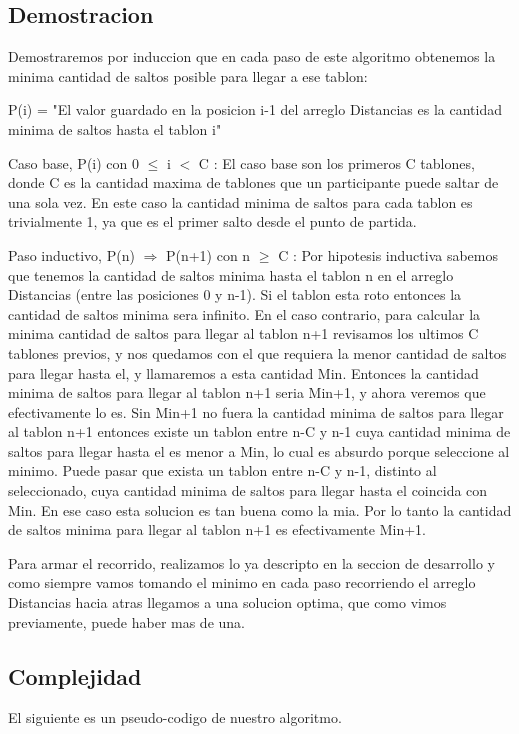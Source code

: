 \subsection{Demostracion}

Demostraremos por induccion que en cada paso de este algoritmo obtenemos la minima cantidad de saltos posible para llegar a ese tablon:

P(i) = "El valor guardado en la posicion i-1 del arreglo Distancias es la cantidad minima de saltos hasta el tablon i"

Caso base, P(i) con 0 $\leq$ i $<$ C :
El caso base son los primeros C tablones, donde C es la cantidad maxima de tablones que un participante puede saltar de una sola vez. En este caso la cantidad minima de saltos para cada tablon es trivialmente 1, ya que es el primer salto desde el punto de partida.

Paso inductivo, P(n) $ \Rightarrow $ P(n+1) con n $\geq$ C :
Por hipotesis inductiva sabemos que tenemos la cantidad de saltos minima hasta el tablon n en el arreglo Distancias (entre las posiciones 0 y n-1). Si el tablon esta roto entonces la cantidad de saltos minima sera infinito. En el caso contrario, para calcular la minima cantidad de saltos para llegar al tablon n+1 revisamos los ultimos C tablones previos, y nos quedamos con el que requiera la menor cantidad de saltos para llegar hasta el, y llamaremos a esta cantidad Min. Entonces la cantidad minima de saltos para llegar al tablon n+1 seria Min+1, y ahora veremos que efectivamente lo es.
Sin Min+1 no fuera la cantidad minima de saltos para llegar al tablon n+1 entonces existe un tablon entre n-C y n-1 cuya cantidad minima de saltos para llegar hasta el es menor a Min, lo cual es absurdo porque seleccione al minimo.
Puede pasar que exista un tablon entre n-C y n-1, distinto al seleccionado, cuya cantidad minima de saltos para llegar hasta el coincida con Min. En ese caso esta solucion es tan buena como la mia. Por lo tanto la cantidad de saltos minima para llegar al tablon n+1 es efectivamente Min+1.

Para armar el recorrido, realizamos lo ya descripto en la seccion de desarrollo y como siempre vamos tomando el minimo en cada paso recorriendo el arreglo Distancias hacia atras llegamos a una solucion optima, que como vimos previamente, puede haber mas de una. 


\subsection{Complejidad}
El siguiente es un pseudo-codigo de nuestro algoritmo.

